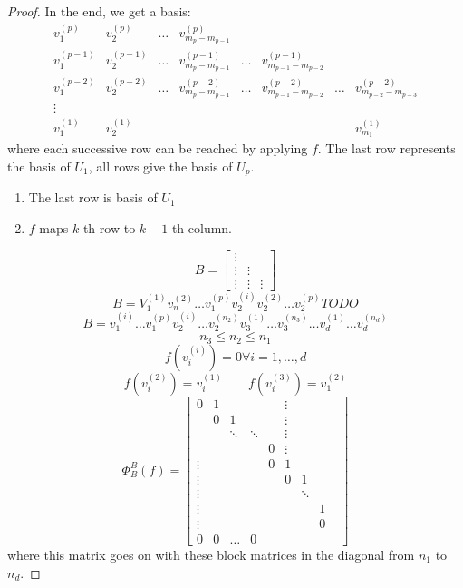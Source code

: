\documentclass{article}
\begin{document}
\begin{proof}
  In the end, we get a basis:
  \[
  \begin{array}{cccccccc}
    v_1^{(p)} & v_2^{(p)} & \dots & v_{m_p - m_{p-1}}^{(p)} &  & & & \\
    v_1^{(p-1)} & v_2^{(p-1)} & \dots & v_{m_p - m_{p-1}}^{(p-1)} & \dots & v_{m_{p-1} - m_{p-2}}^{(p-1)} & & \\
    v_1^{(p-2)} & v_2^{(p-2)} & \dots & v_{m_p - m_{p-1}}^{(p-2)} & \dots & v_{m_{p-1} - m_{p-2}}^{(p-2)} & \dots & v_{m_{p-2} - m_{p-3}}^{(p-2)} \\
    \vdots & & &  & & & & \\
    v_1^{(1)} & v_2^{(1)} & & & & & & v_{m_1}^{(1)}
  \end{array}
  \]
  where each successive row can be reached by applying $f$.
  The last row represents the basis of $U_1$, all rows give the basis of $U_p$.
  \begin{enumerate}
    \item The last row is basis of $U_1$
    \item $f$ maps $k$-th row to $k-1$-th column.
  \end{enumerate}
  \[
    B = \begin{bmatrix}
      \vdots & & \\
      \vdots & \vdots & \\
      \vdots & \vdots & \vdots
    \end{bmatrix}
  \]
  \[
    B = V_1^{(1)} v_n^{(2)} \dots v_1^{(p)} v_2^{(i)} v_{2}^{(2)} \dots v_2^{(p)}
    TODO
  \]
  \[ B = v_1^{(i)} \dots v_1^{(p)} v_2^{(i)} \dots v_2^{(n_2)} v_3^{(1)} \dots v_3^{(n_3)} \dots v_d^{(1)} \dots v_d^{(n_d)} \]
  \[ n_3 \leq n_2 \leq n_1 \]
  \[ f(v_i^{(i)}) = 0 \forall i = 1, \dots, d \]
  \[ f(v_i^{(2)}) = v_i^{(1)} \qquad f(v_i^{(3)}) = v_1^{(2)} \]
  \[
    \Phi_B^B(f) = \begin{bmatrix}
      0 & 1 &        &        &   & \vdots & & & \\
        & 0 & 1      &        &   & \vdots & & & \\
        &   & \ddots & \ddots &   & \vdots & & & \\
        &   &        &        & 0 & \vdots & & & \\
      \vdots &       &        &   & 0 & 1 &        & \\
      \vdots &       &        &   &   & 0 & 1      & \\
      \vdots &       &        &   &   &   & \ddots & \\
      \vdots &       &        &   &   &   &        & 1 \\
      \vdots &       &        &   &   &   &        & 0 \\
      0 &      0     &\dots   & 0 &   &   &        &
    \end{bmatrix}
  \]
  where this matrix goes on with these block matrices in the diagonal from $n_1$ to $n_d$.
 \end{proof}
\end{document}
